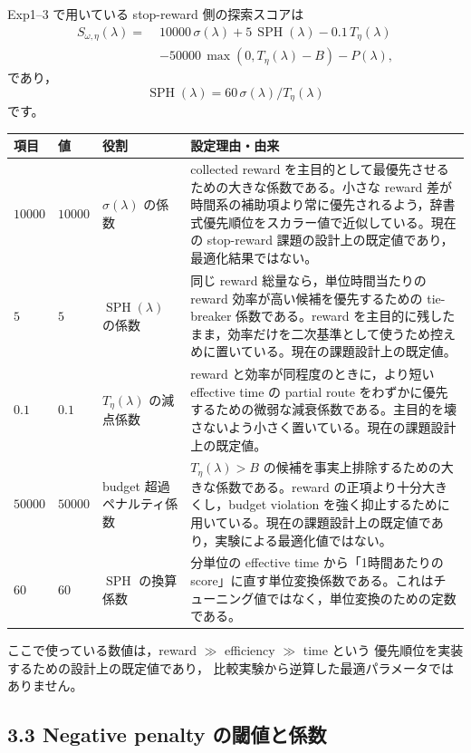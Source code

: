 \documentclass[a4paper,11pt]{article}
\begin{document}
Exp1--3 で用いている stop-reward 側の探索スコアは
\[
\begin{aligned}
S_{\omega,\eta}(\lambda)
=\;& 10000 \, \sigma(\lambda)
+ 5 \, \operatorname{SPH}(\lambda)
- 0.1 \, T_{\eta}(\lambda) \\
&- 50000 \, \max\!\left(0, T_{\eta}(\lambda)-B\right)
- P(\lambda),
\end{aligned}
\]
であり，
\[
\operatorname{SPH}(\lambda)=60\,\sigma(\lambda)/T_{\eta}(\lambda)
\]
です。

\begin{tabularx}{\linewidth}{L{2.1cm}L{2.0cm}L{3.4cm}X}
\toprule
項目 & 値 & 役割 & 設定理由・由来 \\
\midrule
$10000$ & $10000$ & $\sigma(\lambda)$ の係数 & collected reward を主目的として最優先させるための大きな係数である。小さな reward 差が時間系の補助項より常に優先されるよう，辞書式優先順位をスカラー値で近似している。現在の stop-reward 課題の設計上の既定値であり，最適化結果ではない。 \\
$5$ & $5$ & $\operatorname{SPH}(\lambda)$ の係数 & 同じ reward 総量なら，単位時間当たりの reward 効率が高い候補を優先するための tie-breaker 係数である。reward を主目的に残したまま，効率だけを二次基準として使うため控えめに置いている。現在の課題設計上の既定値。 \\
$0.1$ & $0.1$ & $T_{\eta}(\lambda)$ の減点係数 & reward と効率が同程度のときに，より短い effective time の partial route をわずかに優先するための微弱な減衰係数である。主目的を壊さないよう小さく置いている。現在の課題設計上の既定値。 \\
$50000$ & $50000$ & budget 超過ペナルティ係数 & $T_{\eta}(\lambda)>B$ の候補を事実上排除するための大きな係数である。reward の正項より十分大きくし，budget violation を強く抑止するために用いている。現在の課題設計上の既定値であり，実験による最適化値ではない。 \\
$60$ & $60$ & $\operatorname{SPH}$ の換算係数 & 分単位の effective time から「1時間あたりの score」に直す単位変換係数である。これはチューニング値ではなく，単位変換のための定数である。 \\
\bottomrule
\end{tabularx}

ここで使っている数値は，reward $\gg$ efficiency $\gg$ time という
優先順位を実装するための設計上の既定値であり，
比較実験から逆算した最適パラメータではありません。

\subsection*{3.3 Negative penalty の閾値と係数}
\end{document}
